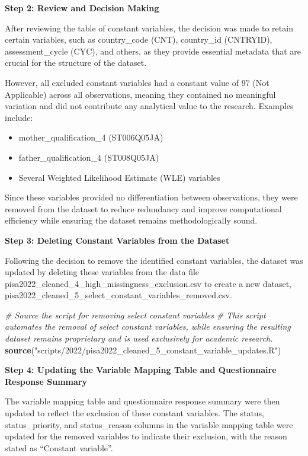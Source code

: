 \documentclass[
]{article}
\newenvironment{Shaded}{\begin{snugshade}}{\end{snugshade}}
\newcommand{\CommentTok}[1]{\textcolor[rgb]{0.56,0.35,0.01}{\textit{#1}}}
\newcommand{\FunctionTok}[1]{\textcolor[rgb]{0.13,0.29,0.53}{\textbf{#1}}}
\newcommand{\NormalTok}[1]{#1}
\newcommand{\StringTok}[1]{\textcolor[rgb]{0.31,0.60,0.02}{#1}}
\begin{document}
\textbf{Step 2: Review and Decision Making}

After reviewing the table of constant variables, the decision was made
to retain certain variables, such as country\_code (CNT), country\_id
(CNTRYID), assessment\_cycle (CYC), and others, as they provide
essential metadata that are crucial for the structure of the dataset.

However, all excluded constant variables had a constant value of 97 (Not
Applicable) across all observations, meaning they contained no
meaningful variation and did not contribute any analytical value to the
research. Examples include:

\begin{itemize}
\item
  mother\_qualification\_4 (ST006Q05JA)
\item
  father\_qualification\_4 (ST008Q05JA)
\item
  Several Weighted Likelihood Estimate (WLE) variables
\end{itemize}

Since these variables provided no differentiation between observations,
they were removed from the dataset to reduce redundancy and improve
computational efficiency while ensuring the dataset remains
methodologically sound.

\textbf{Step 3: Deleting Constant Variables from the Dataset}

Following the decision to remove the identified constant variables, the
dataset was updated by deleting these variables from the data file
pisa2022\_cleaned\_4\_high\_missingness\_exclusion.csv to create a new
dataset, pisa2022\_cleaned\_5\_select\_constant\_variables\_removed.csv.

\begin{Shaded}
\begin{Highlighting}[]
\CommentTok{\# Source the script for removing select constant variables}
\CommentTok{\# This script automates the removal of select constant variables, while ensuring the resulting dataset remains proprietary and is used exclusively for academic research.}
\FunctionTok{source}\NormalTok{(}\StringTok{"scripts/2022/pisa2022\_cleaned\_5\_constant\_variable\_updates.R"}\NormalTok{)}
\end{Highlighting}
\end{Shaded}

\textbf{Step 4: Updating the Variable Mapping Table and Questionnaire
Response Summary}

The variable mapping table and questionnaire response summary were then
updated to reflect the exclusion of these constant variables. The
status, status\_priority, and status\_reason columns in the variable
mapping table were updated for the removed variables to indicate their
exclusion, with the reason stated as ``Constant variable''.
\end{document}
